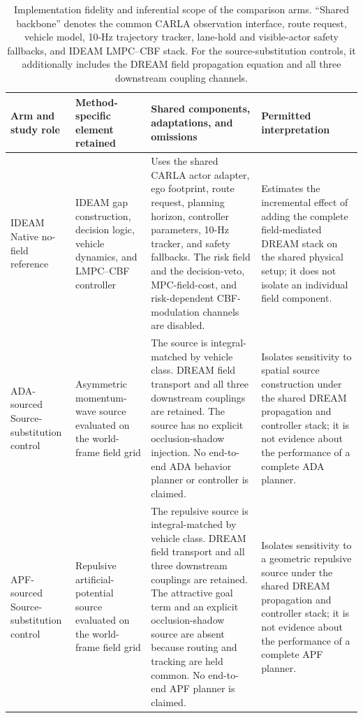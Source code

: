 \begin{table}[t]
  \centering
  \caption{Implementation fidelity and inferential scope of the comparison
  arms. ``Shared backbone'' denotes the common CARLA observation interface,
  route request, vehicle model, 10-Hz trajectory tracker, lane-hold and
  visible-actor safety fallbacks, and IDEAM LMPC--CBF stack.  For the
  source-substitution controls, it additionally includes the DREAM field
  propagation equation and all three downstream coupling channels.}
  \label{tab:baseline_fidelity}
  \begingroup
  \scriptsize
  \setlength{\tabcolsep}{4pt}
  \renewcommand{\arraystretch}{1.10}
  \begin{tabularx}{\textwidth}{@{}p{}p{}p{}X@{}}
    \toprule
    Arm and study role & Method-specific element retained & Shared components, adaptations, and omissions & Permitted interpretation \\
    \midrule
    IDEAM
    \newline Native no-field reference
    & IDEAM gap construction, decision logic, vehicle dynamics, and LMPC--CBF controller
    & Uses the shared CARLA actor adapter, ego footprint, route request, planning horizon, controller parameters, 10-Hz tracker, and safety fallbacks.  The risk field and the decision-veto, MPC-field-cost, and risk-dependent CBF-modulation channels are disabled.
    & Estimates the incremental effect of adding the complete field-mediated DREAM stack on the shared physical setup; it does not isolate an individual field component. \\

    ADA-sourced
    \newline Source-substitution control
    & Asymmetric momentum-wave source evaluated on the world-frame field grid
    & The source is integral-matched by vehicle class.  DREAM field transport and all three downstream couplings are retained.  The source has no explicit occlusion-shadow injection.  No end-to-end ADA behavior planner or controller is claimed.
    & Isolates sensitivity to spatial source construction under the shared DREAM propagation and controller stack; it is not evidence about the performance of a complete ADA planner. \\

    APF-sourced
    \newline Source-substitution control
    & Repulsive artificial-potential source evaluated on the world-frame field grid
    & The repulsive source is integral-matched by vehicle class.  DREAM field transport and all three downstream couplings are retained.  The attractive goal term and an explicit occlusion-shadow source are absent because routing and tracking are held common.  No end-to-end APF planner is claimed.
    & Isolates sensitivity to a geometric repulsive source under the shared DREAM propagation and controller stack; it is not evidence about the performance of a complete APF planner. \\


\end{tabularx}
\end{table}

